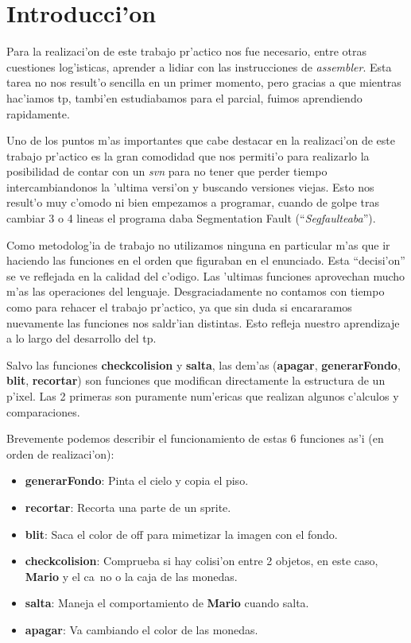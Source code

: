 \section{Introducci'on}

	Para la realizaci'on de este trabajo pr'actico nos fue necesario, entre
otras cuestiones log'isticas, aprender a lidiar con las instrucciones de \textit{assembler}.
Esta tarea no nos result'o sencilla en un primer momento, pero gracias a que
mientras hac'iamos tp, tambi'en estudiabamos para el parcial, fuimos aprendiendo
rapidamente.

	Uno de los puntos m'as importantes que cabe destacar en la
realizaci'on de este trabajo pr'actico es la gran comodidad que nos permiti'o
para realizarlo la posibilidad de contar con un \textit{svn} para no tener que perder
tiempo intercambiandonos la 'ultima versi'on y buscando versiones viejas. Esto
nos result'o muy c'omodo ni bien empezamos a programar, cuando de golpe tras
cambiar 3 o 4 lineas el programa daba Segmentation Fault (``\textit{Segfaulteaba}'').

	Como metodolog'ia de trabajo no utilizamos ninguna en particular m'as que
ir haciendo las funciones en el orden que figuraban en el enunciado. Esta
``decisi'on'' se ve reflejada en la calidad del c'odigo. Las 'ultimas funciones
aprovechan mucho m'as las operaciones del lenguaje. Desgraciadamente no
contamos con tiempo como para rehacer el trabajo pr'actico, ya que sin duda si
encararamos nuevamente las funciones nos saldr'ian distintas. Esto refleja
nuestro aprendizaje a lo largo del desarrollo del tp.

	Salvo las funciones \textbf{checkcolision} y \textbf{salta}, las dem'as
(\textbf{apagar}, \textbf{generarFondo}, \textbf{blit}, \textbf{recortar}) son
funciones que modifican directamente la estructura de un p'ixel. Las 2 primeras
son puramente num'ericas que realizan algunos c'alculos y comparaciones.

	Brevemente podemos describir el funcionamiento de estas 6 funciones as'i
(en orden de realizaci'on):

\begin{itemize}
	\item \textbf{generarFondo}: Pinta el cielo y copia el piso.
	\item \textbf{recortar}: Recorta una parte de un sprite.
	\item \textbf{blit}: Saca el color de off para mimetizar la imagen con el fondo.
	\item \textbf{checkcolision}: Comprueba si hay colisi'on entre 2 objetos, en este
caso, \textbf{Mario} y el ca~no o la caja de las monedas.
	\item \textbf{salta}: Maneja el comportamiento de \textbf{Mario} cuando salta.
	\item \textbf{apagar}: Va cambiando el color de las monedas.
\end{itemize}

